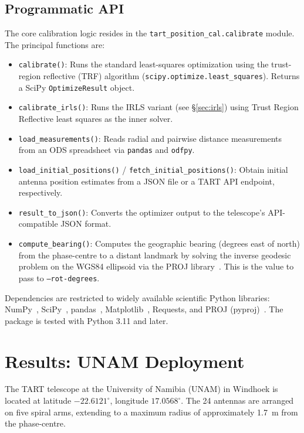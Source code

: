 \documentclass[twocolumn, a4paper,10pt]{article}
\begin{document}
\subsection{Programmatic API}

The core calibration logic resides in the \texttt{tart\_position\_cal.calibrate} module. The principal functions are:

\begin{itemize}
	\item \texttt{calibrate()}: Runs the standard least-squares optimization using the trust-region reflective (TRF) algorithm (\texttt{scipy.optimize.least\_squares}). Returns a SciPy \texttt{OptimizeResult} object.
	\item \texttt{calibrate\_irls()}: Runs the IRLS variant (see \S\ref{sec:irls}) using Trust Region Reflective least squares as the inner solver.
	\item \texttt{load\_measurements()}: Reads radial and pairwise distance measurements from an ODS spreadsheet via \texttt{pandas} and \texttt{odfpy}.
	\item \texttt{load\_initial\_positions()} / \texttt{fetch\_initial\_positions()}: Obtain initial antenna position estimates from a JSON file or a TART API endpoint, respectively.
	\item \texttt{result\_to\_json()}: Converts the optimizer output to the telescope's API-compatible JSON format.
	\item \texttt{compute\_bearing()}: Computes the geographic bearing (degrees east of north) from the phase-centre to a distant landmark by solving the inverse geodesic problem on the WGS84 ellipsoid via the PROJ library~\cite{proj}. This is the value to pass to \texttt{--rot-degrees}.
\end{itemize}

Dependencies are restricted to widely available scientific Python libraries: NumPy~\cite{numpy}, SciPy~\cite{scipy}, pandas~\cite{pandas}, Matplotlib~\cite{matplotlib}, Requests, and PROJ (pyproj)~\cite{proj}. The package is tested with Python 3.11 and later.

\section{Results: UNAM Deployment}

The TART telescope at the University of Namibia (UNAM) in Windhoek is located at latitude $-22.6121^\circ$, longitude $17.0568^\circ$. The 24 antennas are arranged on five spiral arms, extending to a maximum radius of approximately 1.7~m from the phase-centre.
\end{document}
